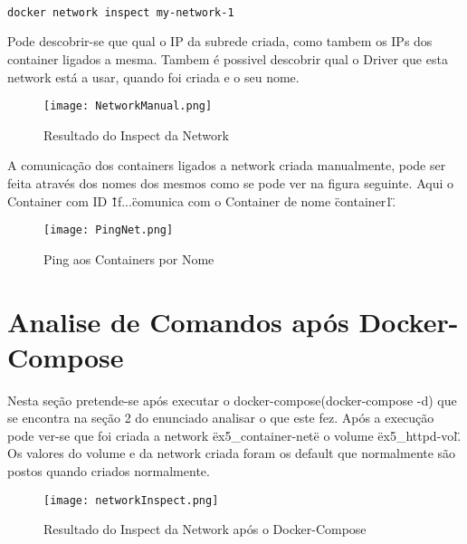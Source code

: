 \begin{lstlisting}

docker network inspect my-network-1

\end{lstlisting}

Pode descobrir-se que qual o IP da subrede criada, como tambem os IPs dos container ligados a mesma.
	Tambem é possivel descobrir qual o Driver que esta network está a usar, quando foi criada e o seu nome.

\begin{figure}[H]

	\centering
	\texttt{[image: NetworkManual.png]}

 	\caption {Resultado do Inspect da Network}

  	\label {fig:sNet}
\end{figure}

A comunicação dos containers ligados a network criada manualmente, pode ser feita através dos nomes dos mesmos como se pode ver na figura seguinte. Aqui o Container com ID \"1f...\" comunica com o Container de nome \"container1\".

\begin{figure}[H]

	\centering
	\texttt{[image: PingNet.png]}

 	\caption {Ping aos Containers por Nome}

  	\label {fig:NomeNet}
\end{figure}

\section{Analise de Comandos após Docker-Compose}

Nesta seção pretende-se após executar o docker-compose(docker-compose -d) que se encontra na seção 2 do enunciado analisar o que este fez. Após a execução pode ver-se que foi criada a network \"ex5\_container-net\" e o volume \"ex5\_httpd-vol\". Os valores do volume e da network criada foram os default que normalmente são postos quando criados normalmente. 

\begin{figure}[H]

	\centering
	\texttt{[image: networkInspect.png]}

 	\caption {Resultado do Inspect da Network após o Docker-Compose}

  	\label {fig:ComposeNetInsp}
\end{figure}

